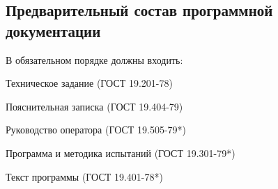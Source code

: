 \subsection{Предварительный состав программной документации}
В обязательном порядке должны входить:
\begin{my_enumerate}
\item Техническое задание  (ГОСТ 19.201-78)
\item Пояснительная записка  (ГОСТ 19.404-79)
\item Руководство оператора  (ГОСТ 19.505-79*)
\item Программа и методика испытаний (ГОСТ 19.301-79*)
\item Текст программы  (ГОСТ 19.401-78*)
\end{my_enumerate}

